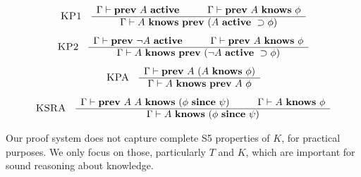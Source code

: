 \[
\begin{array}{cc}
\mbox{\sc KP1}
&
\begin{array}{c}
\Gamma \vdash \Prev\ A\ \Active \hspace*{1cm} \Gamma \vdash \Prev\ A\ \Knows\ \phi \\ \hline
\Gamma \vdash A\ \Knows\ \Prev\ (A\ \Active\ \Implies \phi)
\end{array}
\end{array}
\]\vspace{-0.5em}
\[
\begin{array}{cc}
\mbox{\sc KP2}
&
\begin{array}{c}
\Gamma \vdash \Prev\ \neg A\ \Active \hspace*{1cm} \Gamma \vdash \Prev\ A\ \Knows\ \phi \\ \hline
\Gamma \vdash A\ \Knows\ \Prev\ (\neg A\ \Active\ \Implies \phi)
\end{array}
\end{array}
\]\vspace{-0.5em}
%
\[
\begin{array}{cc}
\mbox{\sc KPA}
&
\begin{array}{c}
\Gamma \vdash \mathbf{prev}\ A\ (A\ \mathbf{knows}\ \phi) \\ \hline
\Gamma \vdash A\ \mathbf{knows}\ \mathbf{prev}\ A\ \phi
\end{array}
\end{array}
\]\vspace{-0.5em}
\[
\begin{array}{cc}
\mbox{\sc KSRA}
&
\begin{array}{c}
\Gamma \vdash \mathbf{prev}\ A\ A\ \mathbf{knows}\ (\phi\ \mathbf{since}\ \psi) \hspace*{1cm} \Gamma \vdash A\ \mathbf{knows}\ \phi \\ \hline
\Gamma \vdash A\ \mathbf{knows}\ (\phi\ \mathbf{since}\ \psi)
\end{array}
\end{array}
\]
%

Our proof system does not capture complete S5 properties of $K$, for practical purposes. We only focus on those, particularly $T$ and $K$, which are important for sound reasoning about knowledge.

